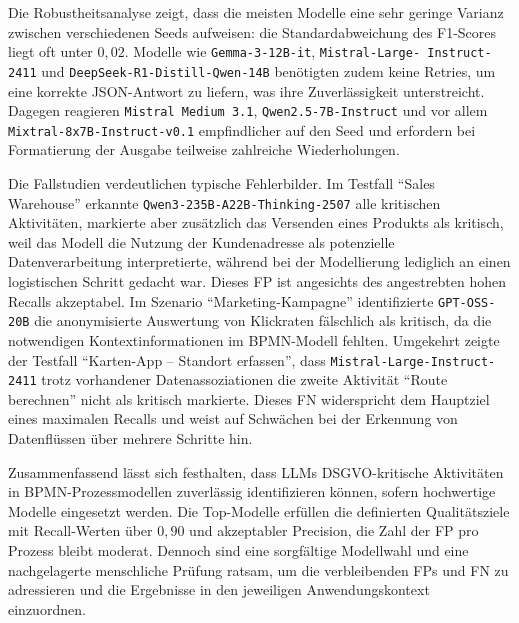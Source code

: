 Die Robustheitsanalyse zeigt, dass die meisten Modelle eine sehr geringe Varianz zwischen verschiedenen Seeds aufweisen: die Standardabweichung des F1-Scores liegt oft unter $0{,}02$. Modelle wie \texttt{Gemma-3-12B-it}, \texttt{Mistral-Large-\linebreak~Instruct-2411} und \texttt{DeepSeek-R1-Distill-Qwen-14B} benötigten zudem keine Retries, um eine korrekte JSON-Antwort zu liefern, was ihre Zuverlässigkeit unterstreicht. Dagegen reagieren \texttt{Mistral Medium 3.1}, \texttt{Qwen2.5-7B-Instruct} und vor allem \texttt{Mixtral-8x7B-Instruct-v0.1} empfindlicher auf den Seed und erfordern bei Formatierung der Ausgabe teilweise zahlreiche Wiederholungen.

Die Fallstudien verdeutlichen typische Fehlerbilder. Im Testfall \enquote{Sales Warehouse} erkannte \texttt{Qwen3-235B-A22B-Thinking-2507} alle kritischen Aktivitäten, markierte aber zusätzlich das Versenden eines Produkts als kritisch, weil das Modell die Nutzung der Kundenadresse als potenzielle Datenverarbeitung interpretierte, während bei der Modellierung lediglich an einen logistischen Schritt gedacht war. Dieses \ac{FP} ist angesichts des angestrebten hohen Recalls akzeptabel. Im Szenario \enquote{Marketing-Kampagne} identifizierte \texttt{GPT-OSS-20B} die anonymisierte Auswertung von Klickraten fälschlich als kritisch, da die notwendigen Kontextinformationen im \ac{BPMN}-Modell fehlten. Umgekehrt zeigte der Testfall \enquote{Karten-App – Standort erfassen}, dass \texttt{Mistral-Large-Instruct-2411} trotz vorhandener Datenassoziationen die zweite Aktivität \enquote{Route berechnen} nicht als kritisch markierte. Dieses \ac{FN} widerspricht dem Hauptziel eines maximalen Recalls und weist auf Schwächen bei der Erkennung von Datenflüssen über mehrere Schritte hin.

Zusammenfassend lässt sich festhalten, dass \acp{LLM} \ac{DSGVO}-kritische Aktivitäten in \ac{BPMN}-Prozessmodellen zuverlässig identifizieren können, sofern hochwertige Modelle eingesetzt werden. Die Top-Modelle erfüllen die definierten Qualitätsziele mit Recall-Werten über $0{,}90$ und akzeptabler Precision, die Zahl der \ac{FP} pro Prozess bleibt moderat. Dennoch sind eine sorgfältige Modellwahl und eine nachgelagerte menschliche Prüfung ratsam, um die verbleibenden \acp{FP} und \ac{FN} zu adressieren und die Ergebnisse in den jeweiligen Anwendungskontext einzuordnen.
